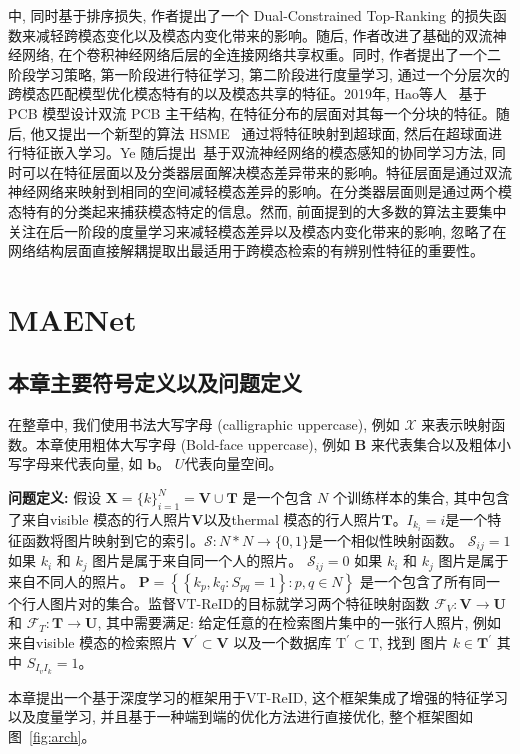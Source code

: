 中, 同时基于排序损失, 作者提出了一个 Dual-Constrained Top-Ranking 的损失函数来减轻跨模态变化以及模态内变化带来的影响。随后, 作者改进了基础的双流神经网络, 在个卷积神经网络后层的全连接网络共享权重。同时, 作者提出了一个二阶段学习策略, 第一阶段进行特征学习, 第二阶段进行度量学习, 通过一个分层次的跨模态匹配模型优化模态特有的以及模态共享的特征。2019年, Hao等人~\cite{hao2019dual} 基于 PCB 模型设计双流 PCB 主干结构, 在特征分布的层面对其每一个分块的特征。随后, 他又提出一个新型的算法 HSME~\cite{hao2019hsme} 通过将特征映射到超球面, 然后在超球面进行特征嵌入学习。Ye 随后提出~\cite{ye2019modality}基于双流神经网络的模态感知的协同学习方法, 同时可以在特征层面以及分类器层面解决模态差异带来的影响。特征层面是通过双流神经网络来映射到相同的空间减轻模态差异的影响。在分类器层面则是通过两个模态特有的分类起来捕获模态特定的信息。然而, 前面提到的大多数的算法主要集中关注在后一阶段的度量学习来减轻模态差异以及模态内变化带来的影响, 忽略了在网络结构层面直接解耦提取出最适用于跨模态检索的有辨别性特征的重要性。

\section{MAENet}
\subsection{本章主要符号定义以及问题定义}
在整章中, 我们使用书法大写字母 (calligraphic uppercase), 例如 $\mathcal{X}$ 来表示映射函数。本章使用粗体大写字母 (Bold-face uppercase), 例如 $\mathbf{B}$ 来代表集合以及粗体小写字母来代表向量, 如 $\mathbf{b}$。 $U$代表向量空间。 \par
\textbf{问题定义:} 假设 $\mathbf{X}=\{k\}_{i=1}^N=\mathbf{V} \cup \mathbf{T}$ 是一个包含 $N$ 个训练样本的集合, 其中包含了来自visible 模态的行人照片$\mathbf{V}$以及thermal 模态的行人照片$\mathbf{T}$。$I_{k_i} = i$是一个特征函数将图片映射到它的索引。$\mathcal{S}: N * N \rightarrow\{0,1\}$是一个相似性映射函数。 $\mathcal{S}_{ij} = 1$ 如果 $k_i$ 和 $ k_j$ 图片是属于来自同一个人的照片。  $\mathcal{S}_{ij} = 0$ 如果 $k_i$ 和 $ k_j$ 图片是属于来自不同人的照片。 $\mathbf{P}=\left\{\left\{k_p, k_q: S_{p q}=1\right\}: p, q \in N\right\}$ 是一个包含了所有同一个行人图片对的集合。监督VT-ReID的目标就学习两个特征映射函数 $\mathcal{F}_V: \mathbf{V} \rightarrow \mathbf{U}$ 和 $\mathcal{F}_T: \mathbf{T} \rightarrow \mathbf{U}$, 其中需要满足: 给定任意的在检索图片集中的一张行人照片, 例如来自visible 模态的检索照片 $\mathbf{V}^{\prime} \subset \mathbf{V}$ 以及一个数据库 $\mathrm{T}^{\prime} \subset \mathrm{T}$, 找到 图片 $k \in \mathbf{T}^{\prime}$ 其中 $S_{I_v I_k}=1$。\par
本章提出一个基于深度学习的框架用于VT-ReID, 这个框架集成了增强的特征学习以及度量学习, 并且基于一种端到端的优化方法进行直接优化, 整个框架图如图~\ref{fig:arch}。
